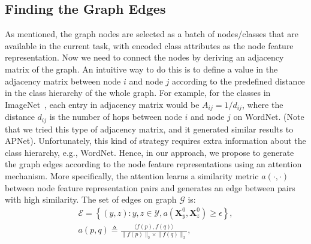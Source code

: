 \documentclass[letterpaper]{article} %
\def\vx{{\bm{x}}}
\def\mX{{\bm{X}}}
\begin{document}

\subsection{Finding the Graph Edges}
As mentioned, the graph nodes are selected as a batch of nodes/classes that are available in the current task, with encoded class attributes as the node feature representation. Now we need to connect the nodes by deriving an adjacency matrix of the graph. An intuitive way to do this is to define a value in the adjacency matrix between node $i$ and node $j$ according to the predefined distance in the class hierarchy of the whole graph. For example, for the classes in ImageNet~\cite{imagenet}, 
each entry in adjacency matrix would be $A_{ij} = 1/d_{ij}$, where the distance $d_{ij}$ is the number of hops between node $i$ and node $j$ on WordNet. 
(Note that we tried this type of adjacency matrix, and it generated similar results to APNet). Unfortunately, this kind of strategy requires extra information about the class hierarchy, e.g., WordNet. Hence, in our approach, we propose to generate the graph edges according to the node feature representations using an attention mechanism. More specifically, the attention learns a similarity metric $a(\cdot, \cdot)$ between node feature representation pairs and generates an edge between pairs with high similarity. The set of edges on graph $\mathcal G$ is:
\begin{align}\label{equ:adj-generation}
\mathcal E = \left\{(y,z): y,z\in\mathcal Y, a(\mX_{y}^{0}, \mX_{z}^{0})\geq\epsilon\right\}, \\
a(p, q)\triangleq\frac{\langle f(p), f(q)\rangle}{\|f(p)\|_2 \times \|f(q)\|_2}, \label{equ:attention}
\end{align}
\end{document}
